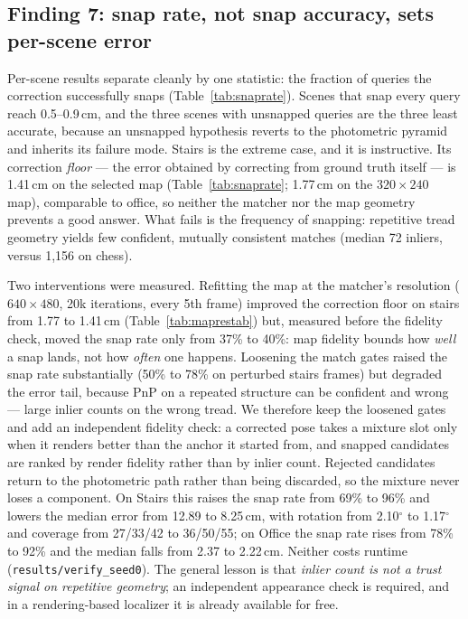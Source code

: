 \documentclass[journal]{IEEEtran}
\begin{document}
\subsection{Finding 7: snap rate, not snap accuracy, sets per-scene error}
\label{sec:snaprate}
Per-scene results separate cleanly by one statistic: the fraction of
queries the correction successfully snaps (Table~\ref{tab:snaprate}).
Scenes that snap every query reach 0.5--0.9\,cm, and the three scenes with
unsnapped queries are the three least accurate, because an unsnapped
hypothesis reverts to the photometric pyramid and inherits its failure mode. Stairs is the extreme case, and it is instructive. Its correction
\emph{floor} --- the error obtained by correcting from ground truth itself
--- is 1.41\,cm on the selected map (Table~\ref{tab:snaprate}; 1.77\,cm on the $320{\times}240$ map), comparable to office, so neither the matcher nor the map geometry prevents a good answer. What fails is the frequency of snapping:
repetitive tread geometry yields few confident, mutually consistent
matches (median 72 inliers, versus 1{,}156 on chess).

Two interventions were measured. Refitting the map at the matcher's
resolution ($640{\times}480$, 20k iterations, every 5th frame) improved the correction floor on stairs from 1.77 to 1.41\,cm (Table~\ref{tab:maprestab}) but, measured before the fidelity check, moved the snap rate only from 37\% to 40\%: map fidelity bounds how \emph{well} a snap lands,
not how \emph{often} one happens. Loosening the match gates raised the snap
rate substantially (50\% to 78\% on perturbed stairs frames) but degraded
the error tail, because PnP on a repeated structure can be confident and
wrong --- large inlier counts on the wrong tread. We therefore keep the
loosened gates and add an independent fidelity check: a corrected pose
takes a mixture slot only when it renders better than the anchor it started
from, and snapped candidates are ranked by render fidelity rather than by
inlier count. Rejected candidates return to the photometric path rather
than being discarded, so the mixture never loses a component. On Stairs
this raises the snap rate from 69\% to 96\% and lowers the median error
from 12.89 to 8.25\,cm, with rotation from 2.10$^\circ$ to 1.17$^\circ$ and
coverage from 27/33/42 to 36/50/55; on Office the snap rate rises from
78\% to 92\% and the median falls from 2.37 to 2.22\,cm. Neither costs
runtime (\texttt{results/verify\_seed0}). The general
lesson is that \emph{inlier count is not a trust signal on repetitive
geometry}; an independent appearance check is required, and in a
rendering-based localizer it is already available for free.
\end{document}
